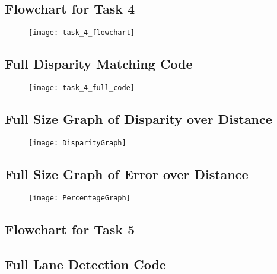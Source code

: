 \documentclass[conference]{IEEEtran}
\begin{document}
\begin{appendix}
 
\subsection{Flowchart for Task 4} \label{appendix:task_4_flowchart}

\begin{figure}[H]
\centerline{\texttt{[image: task\_4\_flowchart]}}
\end{figure}

\subsection{Full Disparity Matching Code} \label{appendix:task_4_disparity_code}

\begin{figure}[H]
\centerline{\texttt{[image: task\_4\_full\_code]}}
\end{figure}

\subsection{Full Size Graph of Disparity over Distance} \label{appendix:DisparityGraph}

\begin{figure}[H]
\centerline{\texttt{[image: DisparityGraph]}}
\end{figure}

\subsection{Full Size Graph of Error over Distance} \label{appendix:PercentageGraph}

\begin{figure}[H]
\centerline{\texttt{[image: PercentageGraph]}}
\end{figure}

\subsection{Flowchart for Task 5} \label{appendix:task_5_flowchart}

\subsection{Full Lane Detection Code} \label{appendix:task_5_lane_code}

\subsection{}

\end{appendix}
\end{document}

